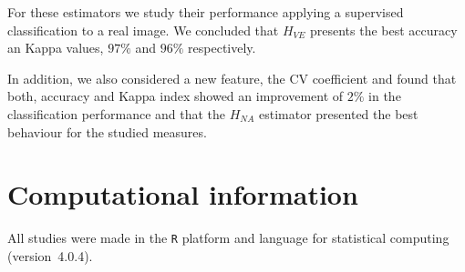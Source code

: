 \documentclass[journal]{IEEEtran}
\begin{document}
For these estimators we study their performance applying a supervised classification to a real image. We concluded that $H_{VE}$ presents the best accuracy an Kappa values, $97\%$ and $96\%$ respectively. 

In addition, we also considered a new feature, the CV coefficient and found that both,  accuracy and Kappa index showed an improvement  of $2\%$ in the classification performance and that the $H_{NA}$ estimator presented the best behaviour for the studied measures.

\section{Computational information}
\label{conclusion}
	
All studies were made in the \texttt R platform and language for statistical computing~\cite{RLanguage} (version~4.0.4).
	
	
{}

	
\end{document}
